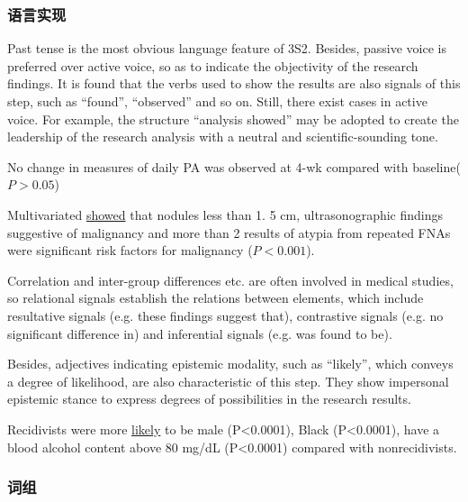 \documentclass[a4paper]{ctexbook}
\begin{document}
    \subsubsection{语言实现}

    Past tense is the most obvious language feature of 3S2. Besides, passive voice is preferred over active voice, so as to indicate the objectivity of the research findings. It is found that the verbs used to show the results are also signals of this step, such as ``found'', ``observed'' and so on. Still, there exist cases in active voice. For example, the structure ``analysis showed'' may be adopted to create the leadership of the research analysis with a neutral and scientific-sounding tone.

    \begin{eg}{}
      No change in measures of daily PA was observed at 4-wk compared with baseline($P>0.05$)   
    \end{eg}

    \begin{eg}{}
      Multivariated  \uline{showed} that nodules less than 1. 5 cm, ultrasonographic findings suggestive of malignancy and more than 2 results of atypia from repeated FNAs were significant risk factors for malignancy ($P<0.001$).  
    \end{eg}

    Correlation and inter-group differences etc. are often involved in medical studies, so relational signals establish the relations between elements, which include resultative signals (e.g. these findings suggest that), contrastive signals (e.g. no significant difference in) and inferential signals (e.g. was found to be).

    Besides, adjectives indicating epistemic modality, such as ``likely'', which conveys a degree of likelihood, are also characteristic of this step. They show impersonal epistemic stance to express degrees of possibilities in the research results.

    \begin{eg}{}
      Recidivists were more \uline{likely} to be male (P<0.0001), Black (P<0.0001), have a blood alcohol content above 80 mg/dL (P<0.0001) compared with nonrecidivists.  
    \end{eg}

    \subsubsection{词组}
\end{document}
